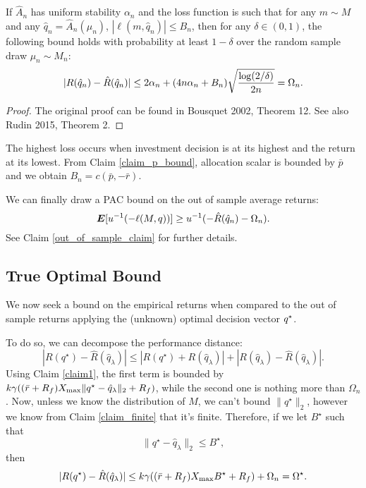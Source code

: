 \documentclass[11pt]{article}
\begin{document}
\begin{thm}
  \label{thm2}
  If $\hat A_n$ has uniform stability $\alpha_n$ and the loss function is such that for
  any $m\sim M$ and any $\hat q_n=\hat A_n(\mu_n)$, $|\ell(m,\hat q_n)|\leq B_n$, then for
  any $\delta\in(0,1)$, the following bound holds with probability at least $1-\delta$
  over the random sample draw $\mu_n\sim M_n$:
  \begin{equation*}
    |R({\hat q}_n) - \hat R({\hat q}_n)| \leq 2\alpha_n + (4n\alpha_n +
    B_n)\sqrt{\frac{\log(2/\delta)}{2n}} = \Omega_n.
  \end{equation*}
\end{thm}

\begin{proof}
  The original proof can be found in Bousquet 2002, Theorem 12. See also Rudin 2015,
  Theorem 2. 
\end{proof}

\begin{rem}
  The highest loss occurs when investment decision is at its highest and the return at its
  lowest. From Claim \ref{claim_p_bound}, allocation scalar is bounded by $\bar p$ and we
  obtain $B_n = c(\bar p, -\bar r)$.
\end{rem}

We can finally draw a PAC bound on the out of sample average returns:
\begin{equation}
  \bm E[u^{-1}(-\ell(M,q))] \geq u^{-1}(-\hat R(\hat q_n) - \Omega_n).
\end{equation}
See Claim \ref{out_of_sample_claim} for further details.
 
\subsection{True Optimal Bound}

We now seek a bound on the empirical returns when compared to the out of sample returns
applying the (unknown) optimal decision vector ${q^\star}$. 

To do so, we can decompose the performance distance: 
\begin{equation*}
  |R(q^\star) - \hat R(\hat q_\lambda)| \leq |R(q^\star) + R(\hat q_\lambda)| 
  + |R(\hat q_\lambda) - \hat R(\hat q_\lambda)|.
\end{equation*}
Using Claim \ref{claim1}, the first term is bounded by
$k\gamma((\bar r+R_f)X_{\max}\|q^\star - \hat q_\lambda\|_2 + R_f)$, while the second one is
nothing more than $\Omega_n$. Now, unless we know the distribution of $M$, we can't bound
$\|q^\star\|_2$, however we know from Claim \ref{claim_finite} that it's
finite. Therefore, if we let $B^\star$ such that
\begin{equation*}
  \|q^\star - \hat q_\lambda\|_2 \leq B^\star,
\end{equation*}
then
\begin{equation*}
  |R(q^\star) - \hat R(\hat q_\lambda)| \leq k\gamma((\bar r+R_f)X_{\max} B^\star + R_f) +
  \Omega_n = \Omega^\star.
\end{equation*}
\end{document}
